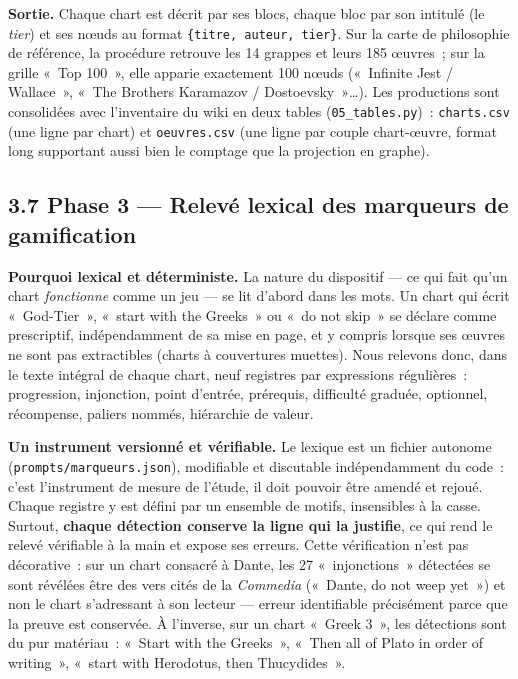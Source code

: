 \documentclass[11pt,a4paper]{article}
\begin{document}
\textbf{Sortie.} Chaque chart est décrit par ses blocs, chaque bloc par son intitulé (le \emph{tier}) et ses nœuds au format \texttt{\{titre, auteur, tier\}}. Sur la carte de philosophie de référence, la procédure retrouve les 14 grappes et leurs 185 œuvres~; sur la grille «~Top 100~», elle apparie exactement 100 nœuds («~Infinite Jest / Wallace~», «~The Brothers Karamazov / Dostoevsky~»…). Les productions sont consolidées avec l'inventaire du wiki en deux tables (\texttt{05\_tables.py})~: \texttt{charts.csv} (une ligne par chart) et \texttt{oeuvres.csv} (une ligne par couple chart-œuvre, format long supportant aussi bien le comptage que la projection en graphe).

\subsection*{3.7 Phase 3 --- Relevé lexical des marqueurs de gamification}

\textbf{Pourquoi lexical et déterministe.} La nature du dispositif --- ce qui fait qu'un chart \emph{fonctionne} comme un jeu --- se lit d'abord dans les mots. Un chart qui écrit «~God-Tier~», «~start with the Greeks~» ou «~do not skip~» se déclare comme prescriptif, indépendamment de sa mise en page, et y compris lorsque ses œuvres ne sont pas extractibles (charts à couvertures muettes). Nous relevons donc, dans le texte intégral de chaque chart, neuf registres par expressions régulières~: progression, injonction, point d'entrée, prérequis, difficulté graduée, optionnel, récompense, paliers nommés, hiérarchie de valeur.

\textbf{Un instrument versionné et vérifiable.} Le lexique est un fichier autonome (\texttt{prompts/marqueurs.json}), modifiable et discutable indépendamment du code~: c'est l'instrument de mesure de l'étude, il doit pouvoir être amendé et rejoué. Chaque registre y est défini par un ensemble de motifs, insensibles à la casse. Surtout, \textbf{chaque détection conserve la ligne qui la justifie}, ce qui rend le relevé vérifiable à la main et expose ses erreurs. Cette vérification n'est pas décorative~: sur un chart consacré à Dante, les 27 «~injonctions~» détectées se sont révélées être des vers cités de la \emph{Commedia} («~Dante, do not weep yet~») et non le chart s'adressant à son lecteur --- erreur identifiable précisément parce que la preuve est conservée. À l'inverse, sur un chart «~Greek 3~», les détections sont du pur matériau~: «~Start with the Greeks~», «~Then all of Plato in order of writing~», «~start with Herodotus, then Thucydides~».
\end{document}
